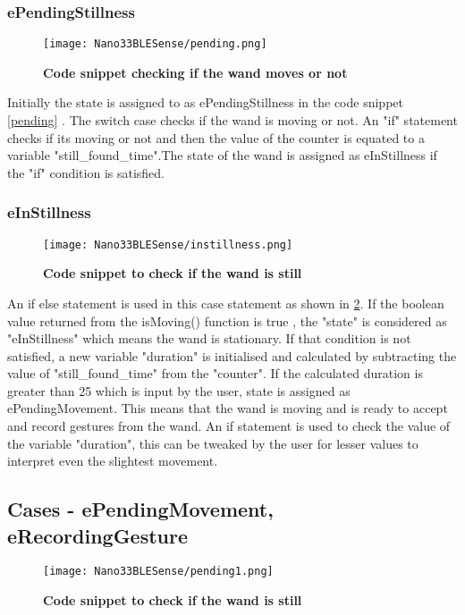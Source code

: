 \subsubsection{ePendingStillness }
\begin{figure}[h!]
    \texttt{[image: Nano33BLESense/pending.png]}
    \caption{\textbf{Code snippet checking if the wand moves or not}}
    \label{instillness}
\end{figure}
Initially the state is assigned to as ePendingStillness in the code snippet \ref{pending} . The switch case checks if the wand is moving or not. An "if" statement checks if its moving or not and then the value of the counter is equated to a variable "still\_found\_time".The state of the wand is assigned as eInStillness if the "if" condition is satisfied.

\subsubsection{eInStillness} 
\begin{figure}[h!]
    \texttt{[image: Nano33BLESense/instillness.png]}
    \caption{\textbf{Code snippet to check if the wand is still}}
    \label{instillness}
\end{figure}

An if else statement is used in this case statement as shown in \ref{instillness}. If the boolean value returned from the isMoving() function is true , the "state" is considered as "eInStillness" which means the wand is stationary. If that condition is not satisfied, a new variable "duration" is initialised and calculated by subtracting  the value of "still\_found\_time" from the "counter".
If the calculated duration is greater than 25 which is input by the user, state is assigned as ePendingMovement. This means that the wand is moving and is ready to accept and record gestures from the wand. 
An if statement is used to check the value of the variable "duration", this can be tweaked by the user for lesser values to interpret even the slightest movement. 

\subsection{Cases - ePendingMovement, eRecordingGesture} 

\begin{figure}[h!]
    \texttt{[image: Nano33BLESense/pending1.png]}
    \caption{\textbf{Code snippet to check if the wand is still}}
    \label{pending1}
\end{figure}


